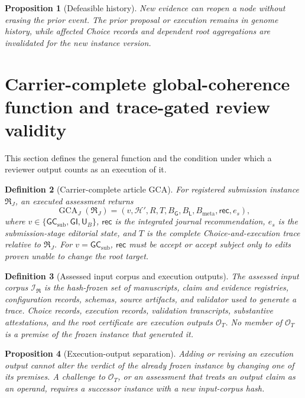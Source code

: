 \documentclass[10pt]{article}
\newtheorem{definition}{Definition}[section]
\newtheorem{proposition}[definition]{Proposition}
\newcommand{\GCA}{\operatorname{GCA}}
\newcommand{\Loc}{\mathsf L}
\newcommand{\Glob}{\mathsf G}
\newcommand{\GI}{\mathsf{GI}}
\newcommand{\UB}{\mathsf{U}_B}
\newcommand{\Genome}{\mathcal H}
\newcommand{\GCsub}{\mathsf{GC}_{\mathrm{sub}}}
\begin{document}
\begin{proposition}[Defeasible history]
New evidence can reopen a node without erasing the prior event.  The prior proposal or execution remains in genome history, while affected Choice records and dependent root aggregations are invalidated for the new instance version.
\end{proposition}


\section{Carrier-complete global-coherence function and trace-gated review validity}

This section defines the general function and the condition under which a reviewer output counts as an execution of it.

\begin{definition}[Carrier-complete article GCA]
For registered submission instance $\mathfrak R_J$, an executed assessment returns
\[
  \GCA_J(\mathfrak R_J)=(v,\Genome',R,T,
  B_\Glob,B_\Loc,B_{\mathrm{meta}},\mathsf{rec},e_s),
\]
where $v\in\{\GCsub,\GI,\UB\}$, $\mathsf{rec}$ is the integrated journal recommendation, $e_s$ is the submission-stage editorial state, and $T$ is the complete Choice-and-execution trace relative to $\mathfrak R_J$.  For $v=\GCsub$, $\mathsf{rec}$ must be accept or accept subject only to edits proven unable to change the root target.
\end{definition}

\begin{definition}[Assessed input corpus and execution outputs]
The assessed input corpus $\mathcal I_{\mathfrak R}$ is the hash-frozen set of manuscripts, claim and evidence registries, configuration records, schemas, source artifacts, and validator used to generate a trace.  Choice records, execution records, validation transcripts, substantive attestations, and the root certificate are execution outputs $\mathcal O_T$.  No member of $\mathcal O_T$ is a premise of the frozen instance that generated it.
\end{definition}

\begin{proposition}[Execution-output separation]\label{prop:output-separation}
Adding or revising an execution output cannot alter the verdict of the already frozen instance by changing one of its premises.  A challenge to $\mathcal O_T$, or an assessment that treats an output claim as an operand, requires a successor instance with a new input-corpus hash.
\end{proposition}
\end{document}
